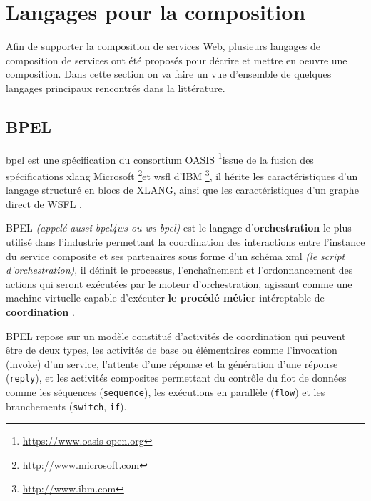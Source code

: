       \newpage

  \section{Langages pour la composition}
  \label{sec:lang-de-comp}
  Afin de supporter la composition de services Web, plusieurs langages
  de composition de services ont été proposés pour décrire et mettre en
  oeuvre une composition. Dans cette section on va faire un vue
  d'ensemble de quelques langages principaux rencontrés dans la
  littérature.
    \subsection{BPEL}
    \label{sec:bpel}

    \acrshort{bpel} est une spécification du consortium OASIS
    \footnote{\url{https://www.oasis-open.org}}issue de la fusion des
    spécifications \acrshort{xlang} Microsoft
    \footnote{\url{http://www.microsoft.com}}et \acrshort{wsfl} d'IBM
    \footnote{\url{http://www.ibm.com}}, il hérite les
    caractéristiques d'un langage structuré en blocs de
    \textsc{XLANG}, ainsi que les caractéristiques d'un graphe direct
    de WSFL \cite{driss2011approche}.

    \textsc{BPEL} \textit{(appelé aussi \acrshort{bpel4ws} ou
      \acrshort{ws-bpel})} est le langage d'\textbf{orchestration}
    le plus utilisé dans l'industrie permettant la coordination des
    interactions entre l'instance du service composite et ses
    partenaires sous forme d'un schéma \acrshort{xml} \textit{(le
      script d'orchestration)}, il définit le processus,
    l'enchaînement et l'ordonnancement des actions qui seront
    exécutées par le moteur d'orchestration, agissant comme une
    machine virtuelle capable d'exécuter \textbf{le procédé métier}
    intéreptable de \textbf{coordination} \cite{chollet2009orchestration}.

    \textsc{BPEL} repose sur un modèle constitué d'activités de
    coordination qui peuvent être de deux types, les activités de base
    ou élémentaires comme l'invocation (invoke) d'un service,
    l'attente d'une réponse et la génération d'une réponse
    (\verb|reply|), et les activités composites permettant du contrôle
    du flot de données comme les séquences (\verb|sequence|), les
    exécutions en parallèle (\verb|flow|) et les branchements
    (\verb|switch|, \verb|if|).

